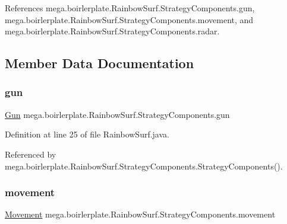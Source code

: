 References mega.\+boirlerplate.\+Rainbow\+Surf.\+Strategy\+Components.\+gun, mega.\+boirlerplate.\+Rainbow\+Surf.\+Strategy\+Components.\+movement, and mega.\+boirlerplate.\+Rainbow\+Surf.\+Strategy\+Components.\+radar.



\subsection{Member Data Documentation}
\mbox{\label{classmega_1_1boirlerplate_1_1_rainbow_surf_1_1_strategy_components_a4e9af62404c7f86d5fc1ef087faaef9c}} 
\subsubsection{\texorpdfstring{gun}{gun}}
{\footnotesize\ttfamily \hyperlink{classmega_1_1boirlerplate_1_1_gun}{Gun} mega.\+boirlerplate.\+Rainbow\+Surf.\+Strategy\+Components.\+gun}



Definition at line 25 of file Rainbow\+Surf.\+java.



Referenced by mega.\+boirlerplate.\+Rainbow\+Surf.\+Strategy\+Components.\+Strategy\+Components().

\mbox{\label{classmega_1_1boirlerplate_1_1_rainbow_surf_1_1_strategy_components_a5129576fecff213f2f0dcfe8a79389c0}} 
\subsubsection{\texorpdfstring{movement}{movement}}
{\footnotesize\ttfamily \hyperlink{classmega_1_1boirlerplate_1_1_movement}{Movement} mega.\+boirlerplate.\+Rainbow\+Surf.\+Strategy\+Components.\+movement}



